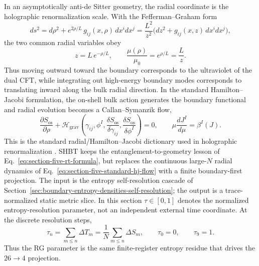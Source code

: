\documentclass[11pt,letterpaper]{article}
\theoremstyle{plain}
\newcommand{\Nbits}{N}
\begin{document}
In an asymptotically anti-de Sitter geometry, the radial coordinate is the
holographic renormalization scale.  With the Fefferman--Graham form
\cite{deharo2001}
\begin{equation}
\label{eq:section-five-fg-radial-coordinate}
 ds^2
 =
 d\rho^2
 +
 e^{2\rho/L}\,g_{ij}(x,\rho)\,dx^i dx^j
 =
 \frac{L^2}{z^2}
 \bigl(dz^2+g_{ij}(x,z)\,dx^i dx^j\bigr),
\end{equation}
the two common radial variables obey
\begin{equation}
\label{eq:section-five-radial-scale-map}
 z=L\,e^{-\rho/L},
 \qquad
 \frac{\mu(\rho)}{\mu_0}=e^{\rho/L}=\frac{L}{z}.
\end{equation}
Thus moving outward toward the boundary corresponds to the ultraviolet of the
dual CFT, while integrating out high-energy boundary modes corresponds to
translating inward along the bulk radial direction.  In the standard
Hamilton--Jacobi formulation, the on-shell bulk action generates the boundary
functional and radial evolution becomes a Callan--Symanzik flow,
\begin{equation}
\label{eq:section-five-standard-hj-flow}
 \frac{\partial S_{\text{os}}}{\partial\rho}
 +
 \mathcal H_{\text{grav}}
 \!\left(
 \gamma_{ij},\phi^I,
 \frac{\delta S_{\text{os}}}{\delta\gamma_{ij}},
 \frac{\delta S_{\text{os}}}{\delta\phi^I}
 \right)
 =
 0,
 \qquad
 \mu\frac{dJ^I}{d\mu}=\beta^I(J).
\end{equation}
This is the standard radial/Hamilton--Jacobi dictionary used in holographic
renormalization \cite{deboer2000,skenderis2002}.
SHBT keeps the entanglement-to-geometry lesson of
Eq.~\eqref{eq:section-five-rt-formula}, but replaces the continuous large-$N$
radial dynamics of Eq.~\eqref{eq:section-five-standard-hj-flow} with a finite
boundary-first projection.  The input is the entropy self-resolution cascade of
Section~\ref{sec:boundary-entropy-densities-self-resolution}; the output is a
trace-normalized static metric slice.  In this section $\tau\in[0,1]$ denotes
the normalized entropy-resolution parameter, not an independent external time
coordinate.  At the discrete resolution steps,
\begin{equation}
\label{eq:section-five-rg-time}
 \tau_n=
 \sum_{m\le n}\Delta T_m
 =
 \frac{1}{\Nbits}
 \sum_{m\le n}\Delta S_m,
 \qquad
 \tau_0=0,
 \qquad
 \tau_9=1.
\end{equation}
Thus the RG parameter is the same finite-register entropy residue that drives
the $26\to4$ projection.
\end{document}
